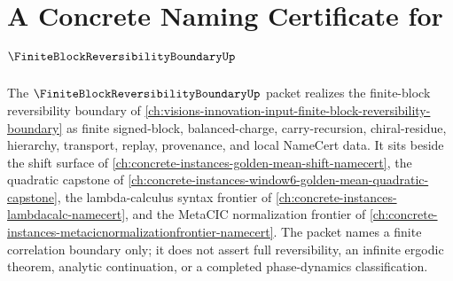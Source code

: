 \chapter{A Concrete Naming Certificate for $\FiniteBlockReversibilityBoundaryUp$}
\label{ch:concrete-instances-finite-block-reversibility-boundary-namecert}

The $\FiniteBlockReversibilityBoundaryUp$ packet realizes the finite-block reversibility boundary of \autoref{ch:visions-innovation-input-finite-block-reversibility-boundary} as finite signed-block, balanced-charge, carry-recursion, chiral-residue, hierarchy, transport, replay, provenance, and local NameCert data. It sits beside the shift surface of \autoref{ch:concrete-instances-golden-mean-shift-namecert}, the quadratic capstone of \autoref{ch:concrete-instances-window6-golden-mean-quadratic-capstone}, the lambda-calculus syntax frontier of \autoref{ch:concrete-instances-lambdacalc-namecert}, and the MetaCIC normalization frontier of \autoref{ch:concrete-instances-metacicnormalizationfrontier-namecert}. The packet names a finite correlation boundary only; it does not assert full reversibility, an infinite ergodic theorem, analytic continuation, or a completed phase-dynamics classification.

